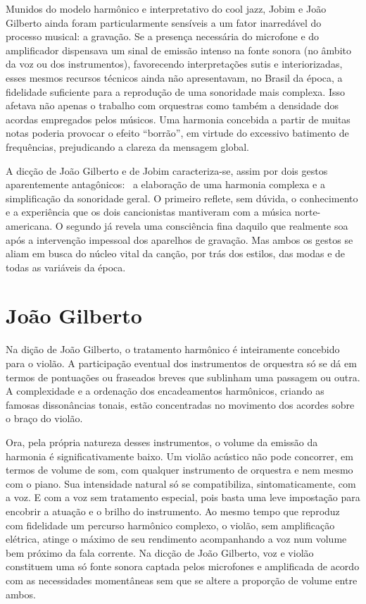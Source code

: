 Munidos do modelo harmônico e interpretativo do cool jazz, Jobim e João
Gilberto ainda foram particularmente sensíveis a um fator inarredável do
processo musical: a gravação. Se a presença necessária do microfone e do
amplificador dispensava um sinal de emissão intenso na fonte sonora (no
âmbito da voz ou dos instrumentos), favorecendo interpretações sutis e
interiorizadas, esses mesmos recursos técnicos ainda não apresentavam,
no Brasil da época, a fidelidade suficiente para a reprodução de uma
sonoridade mais complexa. Isso afetava não apenas o trabalho com
orquestras como também a densidade dos acordas empregados pelos músicos.
Uma harmonia concebida a partir de muitas notas poderia provocar o
efeito ``borrão'', em virtude do excessivo batimento de frequências,
prejudicando a clareza da mensagem global.

A dicção de João Gilberto e de Jobim caracteriza-se, assim por dois
gestos aparentemente antagônicos:~ a elaboração de uma harmonia complexa
e a simplificação da sonoridade geral. O primeiro reflete, sem dúvida, o
conhecimento e a experiência que os dois cancionistas mantiveram com a
música norte-americana. O segundo já revela uma consciência fina daquilo
que realmente soa após a intervenção impessoal dos aparelhos de
gravação. Mas ambos os gestos se aliam em busca do núcleo vital da
canção, por trás dos estilos, das modas e de todas as variáveis da
época.

\section{João Gilberto}

Na dição de João Gilberto, o tratamento harmônico é inteiramente
concebido para o violão. A participação eventual dos instrumentos de
orquestra só se dá em termos de pontuações ou fraseados breves que
sublinham uma passagem ou outra. A complexidade e a ordenação dos
encadeamentos harmônicos, criando as famosas dissonâncias tonais, estão
concentradas no movimento dos acordes sobre o braço do violão.

Ora, pela própria natureza desses instrumentos, o volume da emissão da
harmonia é significativamente baixo. Um violão acústico não pode
concorrer, em termos de volume de som, com qualquer instrumento de
orquestra e nem mesmo com o piano. Sua intensidade natural só se
compatibiliza, sintomaticamente, com a voz. E com a voz sem tratamento
especial, pois basta uma leve impostação para encobrir a atuação e o
brilho do instrumento. Ao mesmo tempo que reproduz com fidelidade um
percurso harmônico complexo, o violão, sem amplificação elétrica, atinge
o máximo de seu rendimento acompanhando a voz num volume bem próximo da
fala corrente. Na dicção de João Gilberto, voz e violão constituem uma
só fonte sonora captada pelos microfones e amplificada de acordo com as
necessidades momentâneas sem que se altere a proporção de volume entre
ambos.


